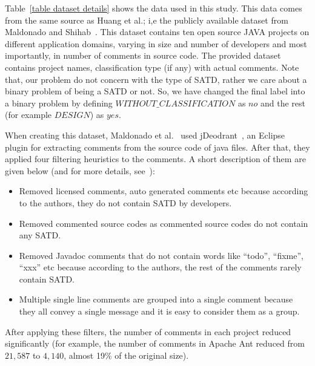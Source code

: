\documentclass[10pt,conference]{IEEEtran}
\begin{document}
Table~\ref{table dataset details} shows the data used in this study.
This data comes  from the same source as Huang et al.; i,e the
publicly available dataset from Maldonado and Shihab~\cite{maldonado2015detecting}.
This dataset contains ten open source JAVA projects on different application domains, varying in size and number of developers and most importantly, in number of comments in source code. 
The provided dataset contains project names, classification type (if any) with actual comments. 
Note that, our problem do not concern with the type of SATD, rather we care about a binary problem of being a SATD or not. 
So, we have changed the final label into a binary problem by defining $\mathit{WITHOUT\_CLASSIFICATION}$ as $no$ and the rest (for example $DESIGN$) as $yes$. 

%

When creating this dataset, Maldonado et al.~\cite{maldonado2015detecting} used jDeodrant~\cite{fokaefs2011jdeodorant}, an Eclipse plugin for extracting comments from the source code of java files. 
After that, they applied four filtering heuristics to the comments. 
A short description of them are given below (and for more details, see~\cite{maldonado2015detecting}):

\begin{itemize}
    \item Removed licensed comments, auto generated comments etc because according to the authors, they do not contain SATD by developers.
    \item Removed commented source codes as commented source codes do not contain any SATD.
    \item Removed Javadoc comments that do not contain  words like ``todo'', ``fixme'', ``xxx'' etc because according to the authors, the rest of the comments rarely contain SATD.
    \item Multiple single line comments are grouped into a single comment because they all convey a single message and it is easy to consider them as a group.
\end{itemize}

After applying these filters, the number of comments in each project reduced significantly (for example, the number of comments in Apache Ant reduced from $21,587$ to $4,140$, almost 19\% of the original size).
\end{document}
